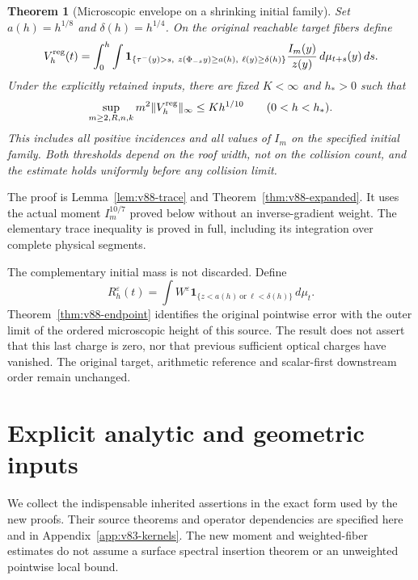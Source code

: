 \documentclass[11pt,reqno]{amsart}
\numberwithin{equation}{section}
\newtheorem{theorem}{Theorem}[section]
\theoremstyle{definition}
\theoremstyle{remark}\newtheorem{remark}[theorem]{Remark}
\newcommand{\one}{\mathbf1}\newcommand{\dd}{\,\mathrm d}
\begin{document}
\begin{theorem}[Microscopic envelope on a shrinking initial family]
\label{thm:v88-main}
Set $a(h)=h^{1/8}$ and $\delta(h)=h^{1/4}$. On the original
reachable target fibers define
\[
 V_h^{\rm reg}(t)=\int_0^h\int
  \one_{\{\tau^-(y)>s,\ z(\Phi_{-s}y)\ge a(h),\ \ell(y)\ge\delta(h)\}}
                      \frac{I_m(y)}{z(y)}\,d\mu_{t+s}(y)\,ds.
\]
Under the explicitly retained inputs, there are fixed $K<\infty$
and $h_*>0$ such that
\begin{equation}\label{eq:v88-main-envelope}
 \sup_{m\ge2,R,n,k}m^2\|V_h^{\rm reg}\|_\infty
                              \le Kh^{1/10}\qquad(0<h<h_*).
\end{equation}
This includes all positive incidences and all values of $I_m$ on
the specified initial family. Both thresholds depend on the roof
width, not on the collision count, and the estimate holds uniformly
before any collision limit.
\end{theorem}
The proof is Lemma~\ref{lem:v88-trace} and
Theorem~\ref{thm:v88-expanded}. It uses the actual moment $I_m^{10/7}$
proved below without an inverse-gradient weight. The elementary trace inequality is proved in
full, including its integration over complete physical segments.

The complementary initial mass is not discarded. Define
\[
 R_h^\varepsilon(t)=\int W^\varepsilon
            \one_{\{z<a(h)\ \mathrm{or}\ \ell<\delta(h)\}}\,d\mu_t.
\]
Theorem~\ref{thm:v88-endpoint} identifies the original pointwise error
with the outer limit of the ordered microscopic height of this source.
The result does not assert that this last charge is zero, nor that
previous sufficient optical charges have vanished. The original
target, arithmetic reference and scalar-first downstream order remain
unchanged.

\section{Explicit analytic and geometric inputs}
We collect the indispensable inherited assertions in the exact form
used by the new proofs. Their source theorems and operator dependencies
are specified here and in Appendix~\ref{app:v83-kernels}. The new
moment and weighted-fiber estimates do not assume a surface spectral
insertion theorem or an unweighted pointwise local bound.
\end{document}
